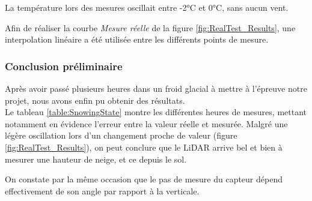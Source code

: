 La température lors des mesures oscillait entre -2°C et 0°C, sans aucun vent.\par 
Afin de réaliser la courbe \emph{Mesure réelle} de la figure \ref{fig:RealTest_Results}, une interpolation
linéaire a été utilisée entre les différents points de mesure.

\subsubsection{Conclusion préliminaire} 

Après avoir passé plusieurs heures dans un froid glacial à mettre à l'épreuve notre projet, nous avons 
enfin pu obtenir des résultats.\\
Le tableau \ref{table:SnowingState} montre les différentes heures de mesures, mettant notamment en évidence
l'erreur entre la valeur réelle et mesurée. Malgré une légère oscillation lors d'un changement proche
de valeur (figure \ref{fig:RealTest_Results}), on peut conclure que le LiDAR arrive bel et bien à mesurer 
une hauteur de neige, et ce depuis le sol.\par 
On constate par la même occasion que le pas de mesure du capteur dépend effectivement de son angle par 
rapport à la verticale.